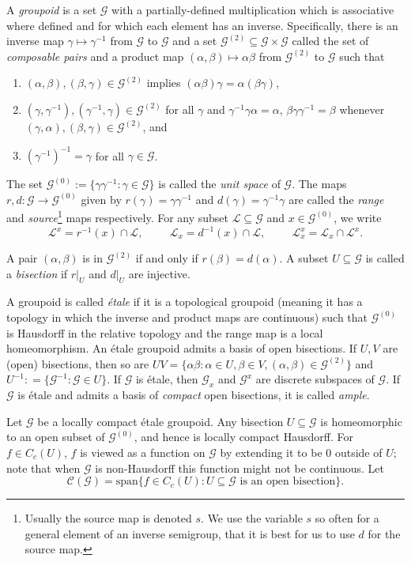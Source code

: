 \documentclass[12pt]{amsart}
\theoremstyle{definition}
\theoremstyle{remark}
\numberwithin{equation}{section}
\newcommand{\mc}{\mathcal}
\renewcommand{\a}{\alpha}
\renewcommand{\b}{\beta}
\newcommand{\gtwo}{\g^{(2)}}
\newcommand{\go}{\g^{(0)}}
\newcommand{\g}{\mathcal{G}}
\newcommand{\C}{\mathcal{C}}
\newcommand{\spn}{\text{span}}
\newcommand{\ga}{\gamma}
\begin{document}
	A {\em groupoid} is a set $\g$ with a partially-defined multiplication which is associative where defined and for which each element has an inverse. Specifically, there is an inverse map $\ga\mapsto\ga^{-1}$ from $\g$ to $\g$ and a set $\gtwo\subseteq \g\times \g$ called the set of {\em composable pairs} and a product map $(\a,\b)\mapsto \a\b$ from $\gtwo$ to $\g$ such that
	\begin{enumerate}
		\item $(\a,\b),(\b,\ga)\in \gtwo$ implies $(\a\b)\ga = \a(\b\ga)$, 
		\item  $(\ga,\ga^{-1}), (\ga^{-1},\ga)\in\gtwo$ for all $\ga$ and $\ga^{-1}\ga\a = \a$, $\b\ga\ga^{-1} = \b$ whenever $(\ga, \a), (\b,\ga)\in\gtwo$, and
		\item $(\ga^{-1})^{-1} = \ga$ for all $\ga\in\g$. 
	\end{enumerate} The set $\go := \{\gamma\gamma^{-1}: \ga\in \g\}$ is called the {\em unit space} of $\g$. The maps $r, d:\g\to \go$ given by $r(\ga) = \ga\ga^{-1}$ and $d(\ga) = \ga^{-1}\ga$ are called the {\em range} and {\em source}\footnote{Usually the source map is denoted $s$. We use the variable $s$ so often for a general element of an inverse semigroup, that it is best for us to use $d$ for the source map.} maps respectively.  For any subset $\mc{L}\subseteq\g$ and $x\in \go$, we write
	\[
	\mc{L}^x = r^{-1}(x)\cap \mc{L}, \hspace{1cm} \mc{L}_x = d^{-1}(x)\cap \mc{L}, \hspace{1cm}\mc{L}^x_x = \mc{L}_x\cap \mc{L}^x.
	\]
	
	A pair $(\a,\b)$ is in $\gtwo$ if and only if $r(\b) = d(\a)$. A subset $U\subseteq \g$ is called a {\em bisection} if $r|_U$ and $d|_U$ are injective. 
	
	A groupoid is called {\em\'etale} if it is a topological groupoid (meaning it has a topology in which the inverse and product maps are continuous) such that $\go$ is Hausdorff in the relative topology and the range map is a local homeomorphism. An \'etale groupoid admits a basis of open bisections. If $U, V$ are (open) bisections, then so are $UV = \{\a\b:\a\in U, \b\in V, (\a,\b)\in \g^{(2)}\}$ and $U^{-1} : = \{\g^{-1}: \g\in U\}$. If $\g$ is \'etale, then $\g_x$ and $\g^x$ are discrete subspaces of $\g$. If $\g$ is \'etale and admits a basis of {\em compact} open bisections, it is called {\em ample}. 
	
	Let $\g$ be a locally compact \'etale groupoid. Any bisection $U\subseteq \g$ is homeomorphic to an open subset of $\go$, and hence is locally compact Hausdorff. For $f\in C_c(U)$, $f$ is viewed as a function on $\g$ by extending it to be 0 outside of $U$; note that when $\g$ is non-Hausdorff this function might not be continuous. Let
	\[
	\C(\g) = \spn \{f\in C_c(U) : U\subseteq \g\text{ is an open bisection}\}.
	\]
	
\end{document}

